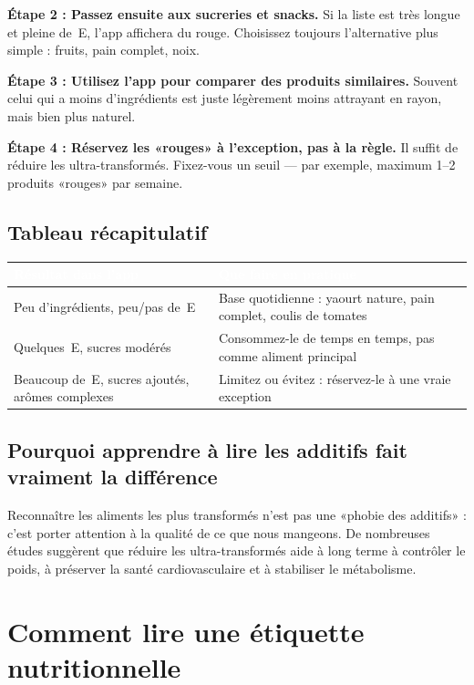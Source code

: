 \documentclass[a5paper,12pt,oneside,openany]{book}
\begin{document}
\textbf{Étape 2 : Passez ensuite aux sucreries et snacks.} Si la liste est très
longue et pleine de~E, l'app affichera du rouge. Choisissez toujours l'alternative
plus simple : fruits, pain complet, noix.

\textbf{Étape 3 : Utilisez l'app pour comparer des produits similaires.} Souvent
celui qui a moins d'ingrédients est juste légèrement moins attrayant en rayon,
mais bien plus naturel.

\textbf{Étape 4 : Réservez les «rouges» à l'exception, pas à la règle.} Il suffit
de réduire les ultra-transformés. Fixez-vous un seuil --- par exemple, maximum
1--2 produits «rouges» par semaine.

\section{Tableau récapitulatif}

{\small
\begin{tabularx}{\textwidth}{|L|L|}
\hline
{}\textcolor{white}{\textbf{Résultat dans l'app}}
  & \textcolor{white}{\textbf{Que faire en pratique}} \\
\hline
Peu d'ingrédients, peu/pas de~E
  & Base quotidienne : yaourt nature, pain complet, coulis de tomates \\
\hline
Quelques~E, sucres modérés
  & Consommez-le de temps en temps, pas comme aliment principal \\
\hline
Beaucoup de~E, sucres ajoutés, arômes complexes
  & Limitez ou évitez : réservez-le à une vraie exception \\
\hline
\end{tabularx}
}

\section{Pourquoi apprendre à lire les additifs fait vraiment la différence}

Reconnaître les aliments les plus transformés n'est pas une «phobie des additifs» :
c'est porter attention à la qualité de ce que nous mangeons. De nombreuses études
suggèrent que réduire les ultra-transformés aide à long terme à contrôler le poids,
à préserver la santé cardiovasculaire et à stabiliser le métabolisme.

\chapter{Comment lire une étiquette nutritionnelle}
\end{document}
